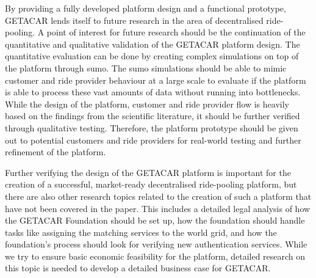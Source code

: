 By providing a fully developed platform design and a functional prototype, GETACAR lends itself to future research in the area of decentralised ride-pooling.
A point of interest for future research should be the continuation of the quantitative and qualitative validation of the GETACAR platform design. The quantitative evaluation can be done by creating complex simulations on top of the platform through \gls{sumo}. The \gls{sumo} simulations should be able to mimic customer and ride provider behaviour at a large scale to evaluate if the platform is able to process these vast amounts of data without running into bottlenecks. While the design of the platform, customer and ride provider flow is heavily based on the findings from the scientific literature, it should be further verified through qualitative testing. Therefore, the platform prototype should be given out to potential customers and ride providers for real-world testing and further refinement of the platform.

Further verifying the design of the GETACAR platform is important for the creation of a successful, market-ready decentralised ride-pooling platform, but there are also other research topics related to the creation of such a platform that have not been covered in the paper. This includes a detailed legal analysis of how the GETACAR Foundation should be set up, how the foundation should handle tasks like assigning the matching services to the world grid, and how the foundation's process should look for verifying new authentication services.
While we try to ensure basic economic feasibility for the platform, detailed research on this topic is needed to develop a detailed business case for GETACAR.